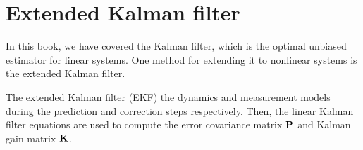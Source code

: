 \section{Extended Kalman filter}
\label{sec:ekf}

In this book, we have covered the Kalman filter, which is the optimal unbiased
estimator for linear \glspl{system}. One method for extending it to nonlinear
systems is the extended Kalman filter.

The extended Kalman filter (EKF)  the
dynamics and measurement models during the prediction and correction steps
respectively. Then, the linear Kalman filter equations are used to compute the
error covariance matrix $\mathbf{P}$ and Kalman gain matrix $\mathbf{K}$.

